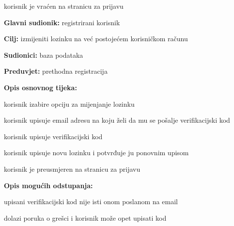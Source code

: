\begin{packed_enum}
\begin{packed_item}
\begin{packed_item}
\begin{packed_enum}
								\item korisnik je vraćen na stranicu za prijavu
								
							\end{packed_enum}
						
							
						\end{packed_item}
					\end{packed_item}
					
					\noindent {}
					\begin{packed_item}
	
						\item \textbf{Glavni sudionik: }registrirani korisnik
						\item  \textbf{Cilj:} izmijeniti lozinku na već postojećem korisničkom računu
						\item  \textbf{Sudionici:} baza podataka
						\item  \textbf{Preduvjet:} prethodna registracija
						\item  \textbf{Opis osnovnog tijeka:}
						
						\item[] \begin{packed_enum}
	
							\item korisnik izabire opciju za mijenjanje lozinku
							\item korisnik upisuje email adresu na koju želi da mu se pošalje verifikacijski kod
							\item korisnik upisuje verifikacijski kod
							\item korisnik upisuje novu lozinku i potvrđuje ju ponovnim upisom
							\item korisnik je preusmjeren na stranicu za prijavu
						\end{packed_enum}
						
						\item  \textbf{Opis mogućih odstupanja:}
						
						\item[] \begin{packed_item}
	
							\item[3.a] upisani verifikacijski kod nije isti onom poslanom na email
							\item[] \begin{packed_enum}
								
								\item dolazi poruka o grešci i korisnik može opet upisati kod
								

\end{packed_enum}
\end{packed_item}
\end{packed_item}
\end{packed_enum}
